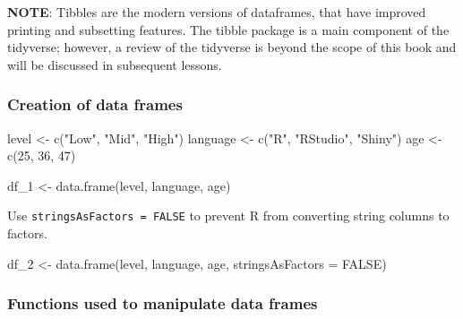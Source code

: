 \documentclass[
  letterpaper,
  DIV=11,
  numbers=noendperiod]{scrreprt}
\newenvironment{Shaded}{\begin{snugshade}}{\end{snugshade}}
\newcommand{\AttributeTok}[1]{\textcolor[rgb]{0.40,0.45,0.13}{#1}}
\newcommand{\ConstantTok}[1]{\textcolor[rgb]{0.56,0.35,0.01}{#1}}
\newcommand{\DecValTok}[1]{\textcolor[rgb]{0.68,0.00,0.00}{#1}}
\newcommand{\FunctionTok}[1]{\textcolor[rgb]{0.28,0.35,0.67}{#1}}
\newcommand{\NormalTok}[1]{\textcolor[rgb]{0.00,0.23,0.31}{#1}}
\newcommand{\OtherTok}[1]{\textcolor[rgb]{0.00,0.23,0.31}{#1}}
\newcommand{\StringTok}[1]{\textcolor[rgb]{0.13,0.47,0.30}{#1}}
\begin{document}
\textbf{NOTE}: Tibbles are the modern versions of dataframes, that have
improved printing and subsetting features. The tibble package is a main
component of the tidyverse; however, a review of the tidyverse is beyond
the scope of this book and will be discussed in subsequent lessons.

\subsubsection{Creation of data frames}\label{creation-of-data-frames}

\begin{Shaded}
\begin{Highlighting}[]
\NormalTok{level }\OtherTok{\textless{}{-}} \FunctionTok{c}\NormalTok{(}\StringTok{"Low"}\NormalTok{, }\StringTok{"Mid"}\NormalTok{, }\StringTok{"High"}\NormalTok{)}
\NormalTok{language }\OtherTok{\textless{}{-}} \FunctionTok{c}\NormalTok{(}\StringTok{"R"}\NormalTok{, }\StringTok{"RStudio"}\NormalTok{, }\StringTok{"Shiny"}\NormalTok{)}
\NormalTok{age }\OtherTok{\textless{}{-}} \FunctionTok{c}\NormalTok{(}\DecValTok{25}\NormalTok{, }\DecValTok{36}\NormalTok{, }\DecValTok{47}\NormalTok{)}
\end{Highlighting}
\end{Shaded}

\begin{Shaded}
\begin{Highlighting}[]
\NormalTok{df\_1 }\OtherTok{\textless{}{-}} \FunctionTok{data.frame}\NormalTok{(level, language, age)}
\end{Highlighting}
\end{Shaded}

Use \texttt{stringsAsFactors\ =\ FALSE} to prevent R from converting
string columns to factors.

\begin{Shaded}
\begin{Highlighting}[]
\NormalTok{df\_2 }\OtherTok{\textless{}{-}} \FunctionTok{data.frame}\NormalTok{(level, language, age, }\AttributeTok{stringsAsFactors =} \ConstantTok{FALSE}\NormalTok{)}
\end{Highlighting}
\end{Shaded}

\subsubsection{Functions used to manipulate data
frames}\label{functions-used-to-manipulate-data-frames}
\end{document}
